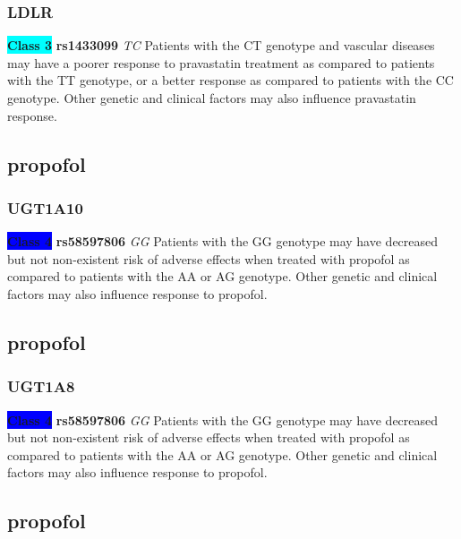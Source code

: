 \documentclass{book}
\begin{document}
\subsubsection{ LDLR }

\begin{center}
\textbf{\colorbox{cyan} {Class 3}} \textbf{ rs1433099 } \textit{ TC }
Patients with the CT genotype and vascular diseases may have a poorer response to pravastatin treatment as compared to patients with the TT genotype, or a better response as compared to patients with the CC genotype. Other genetic and clinical factors may also influence pravastatin response. 


\end{center}\subsection{ propofol }


\subsubsection{ UGT1A10 }

\begin{center}

\textbf{\colorbox{blue} {Class 4}} \textbf{ rs58597806 } \textit{ GG }
Patients with the GG genotype may have decreased but not non-existent risk of adverse effects when treated with propofol as compared to patients with the AA or AG genotype. Other genetic and clinical factors may also influence response to propofol.

\end{center}\subsection{ propofol }


\subsubsection{ UGT1A8 }

\begin{center}

\textbf{\colorbox{blue} {Class 4}} \textbf{ rs58597806 } \textit{ GG }
Patients with the GG genotype may have decreased but not non-existent risk of adverse effects when treated with propofol as compared to patients with the AA or AG genotype. Other genetic and clinical factors may also influence response to propofol.

\end{center}\subsection{ propofol }
\end{document}
